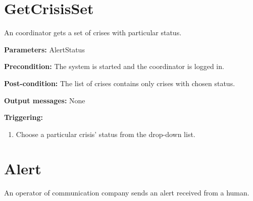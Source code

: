 \section{GetCrisisSet}
\label{operation:GetCrisisSet}

An coordinator gets a set of crises with particular status.

\begin{description}
	\item \textbf{Parameters:} AlertStatus  
	\item \textbf{Precondition:} The system is started and the coordinator is
	logged in.
	\item \textbf{Post-condition:} The list of crises contains only crises with
	chosen status.
	\item \textbf{Output messages:} None
	
	\item \textbf{Triggering:}
	
	\begin{enumerate}
		\item Choose a particular crisis' status from the drop-down list.
	\end{enumerate}
\end{description}



\section{Alert}
\label{operation:Alert}

An operator of communication company sends an alert received from a human.

